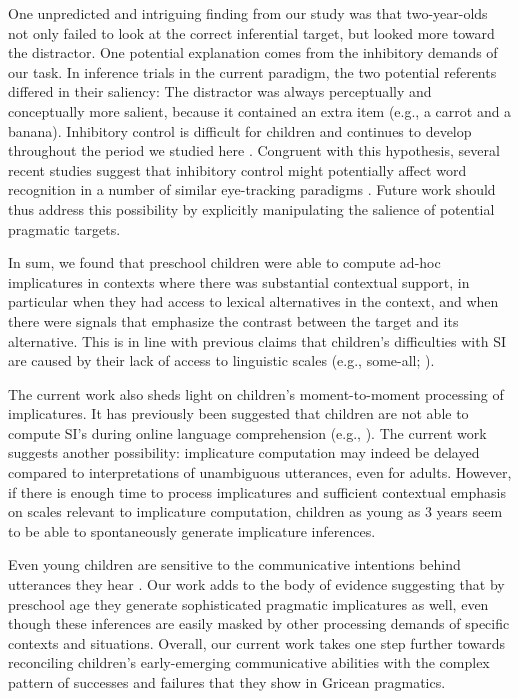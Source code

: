 \documentclass[10pt,letterpaper]{article}
\begin{document}
One unpredicted and intriguing finding from our study was that two-year-olds not only failed to look at the correct inferential target, but looked more toward the distractor. One potential explanation comes from the inhibitory demands of our task. In inference trials in the current paradigm, the two potential referents differed in their saliency: The distractor was always perceptually and conceptually more salient, because it contained an extra item (e.g., a carrot and a banana). Inhibitory control is difficult for children and continues to develop throughout the period we studied here \cite{davidson2006development, gerardi2000sensitivity}. Congruent with this hypothesis, several recent studies suggest that inhibitory control might potentially affect word recognition in a number of similar eye-tracking paradigms \cite{yurovskybeyond,nordmeyer2013measuring}. Future work should thus address this possibility by explicitly manipulating the salience of potential pragmatic targets.

In sum, we found that preschool children were able to compute ad-hoc implicatures in contexts where there was substantial contextual support, in particular when they had access to lexical alternatives in the context, and when there were signals that emphasize the contrast between the target and its alternative. This is in line with previous claims that children's difficulties with SI are caused by their lack of access to linguistic scales (e.g., some-all; ). 

The current work also sheds light on children's moment-to-moment processing of implicatures. It has previously been suggested that children are not able to compute SI's during online language comprehension (e.g., ). The current work suggests another possibility: implicature computation may indeed be delayed compared to interpretations of unambiguous utterances, even for adults. However, if there is enough time to process implicatures and sufficient contextual emphasis on scales relevant to implicature computation, children as young as 3 years seem to be able to spontaneously generate implicature inferences. 

Even young children are sensitive to the communicative intentions behind utterances they hear \cite{clark2009first,baldwin1993early}. Our work adds to the body of evidence suggesting that by preschool age they generate sophisticated pragmatic implicatures as well, even though these inferences are easily masked by other processing demands of specific contexts and situations. Overall, our current work takes one step further towards reconciling children's early-emerging communicative abilities with the complex pattern of successes and failures that they show in Gricean pragmatics.
\end{document}
